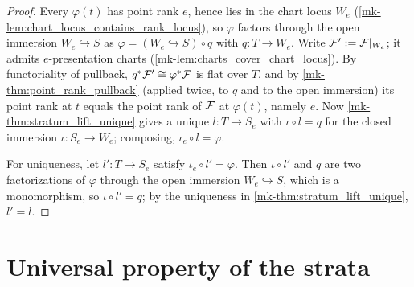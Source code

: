\begin{proof}
  \leanok
  Every \(\varphi(t)\) has point rank \(e\), hence lies in the chart locus
  \(W_e\) (\ref{mk-lem:chart_locus_contains_rank_locus}), so \(\varphi\)
  factors through the open immersion \(W_e \hookrightarrow S\) as
  \(\varphi = (W_e \hookrightarrow S) \circ q\) with \(q : T \to W_e\).
  Write \(\mathcal{F}' := \mathcal{F}|_{W_e}\); it admits \(e\)-presentation charts
  (\ref{mk-lem:charts_cover_chart_locus}).  By functoriality of pullback,
  \(q^*\mathcal{F}' \cong \varphi^*\mathcal{F}\) is flat over \(T\), and by
  \ref{mk-thm:point_rank_pullback} (applied twice, to \(q\) and to the open
  immersion) its point rank at \(t\) equals the point rank of \(\mathcal{F}\) at
  \(\varphi(t)\), namely \(e\).  Now \ref{mk-thm:stratum_lift_unique} gives a
  unique \(l : T \to S_e\) with \(\iota \circ l = q\) for the closed
  immersion \(\iota : S_e \to W_e\); composing,
  \(\iota_e \circ l = \varphi\).

  For uniqueness, let \(l' : T \to S_e\) satisfy
  \(\iota_e \circ l' = \varphi\).  Then \(\iota \circ l'\) and \(q\) are two
  factorizations of \(\varphi\) through the open immersion
  \(W_e \hookrightarrow S\), which is a monomorphism, so
  \(\iota \circ l' = q\); by the uniqueness in
  \ref{mk-thm:stratum_lift_unique}, \(l' = l\).
\end{proof}

\section{Universal property of the strata}
\label{mk-sec:flatstrat_universal}

